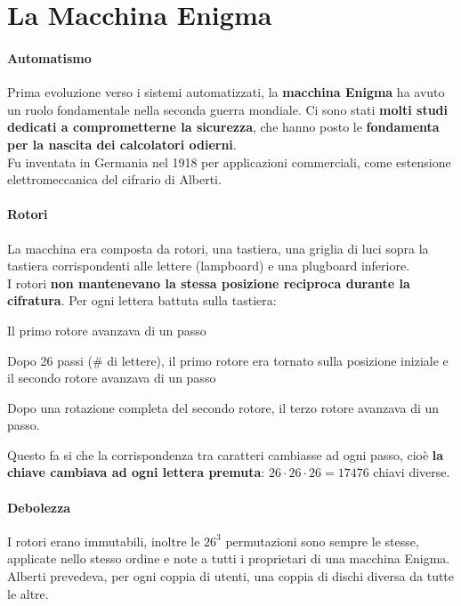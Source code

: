 \documentclass[10pt]{book}
\begin{document}
\section{La Macchina Enigma} \paragraph{Automatismo} Prima evoluzione verso i sistemi automatizzati, la \textbf{macchina Enigma} ha avuto un ruolo fondamentale nella seconda guerra mondiale. Ci sono stati \textbf{molti studi dedicati a comprometterne la sicurezza}, che hanno posto le \textbf{fondamenta per la nascita dei calcolatori odierni}.\\
Fu inventata in Germania nel 1918 per applicazioni commerciali, come estensione elettromeccanica del cifrario di Alberti.
\paragraph{Rotori} La macchina era composta da rotori, una tastiera, una griglia di luci sopra la tastiera corrispondenti alle lettere (lampboard) e una plugboard inferiore.\\
I rotori \textbf{non mantenevano la stessa posizione reciproca durante la cifratura}. Per ogni lettera battuta sulla tastiera:
\begin{list}{}{}
	\item Il primo rotore avanzava di un passo
	\item Dopo 26 passi (\# di lettere), il primo rotore era tornato sulla posizione iniziale e il secondo rotore avanzava di un passo
	\item Dopo una rotazione completa del secondo rotore, il terzo rotore avanzava di un passo.
\end{list}
Questo fa si che la corrispondenza tra caratteri cambiasse ad ogni passo, cioè \textbf{la chiave cambiava ad ogni lettera premuta}: $26\cdot26\cdot26 = 17476$ chiavi diverse.
\paragraph{Debolezza} I rotori erano immutabili, inoltre le $26^3$ permutazioni sono sempre le stesse, applicate nello stesso ordine e note a tutti i proprietari di una macchina Enigma.\\
Alberti prevedeva, per ogni coppia di utenti, una coppia di dischi diversa da tutte le altre.
\end{document}
